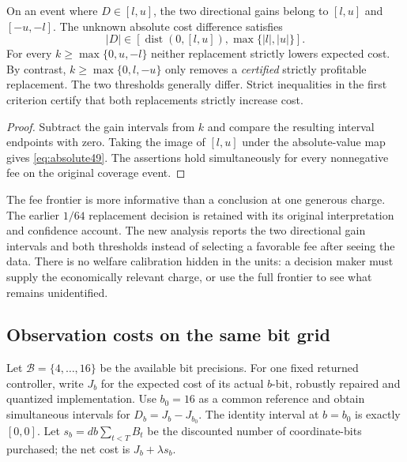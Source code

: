 \begin{corollary}\label{cor:fee49}
On an event where $D\in[l,u]$, the two directional gains belong to $[l,u]$ and $[-u,-l]$. The unknown absolute cost difference satisfies
\begin{equation}\label{eq:absolute49}
 |D|\in[\operatorname{dist}(0,[l,u]),\max\{|l|,|u|\}].
\end{equation}
For every $k\ge\max\{0,u,-l\}$ neither replacement strictly lowers expected cost. By contrast, $k\ge\max\{0,l,-u\}$ only removes a \emph{certified} strictly profitable replacement. The two thresholds generally differ. Strict inequalities in the first criterion certify that both replacements strictly increase cost.
\end{corollary}
\begin{proof}
Subtract the gain intervals from $k$ and compare the resulting interval endpoints with zero. Taking the image of $[l,u]$ under the absolute-value map gives \eqref{eq:absolute49}. The assertions hold simultaneously for every nonnegative fee on the original coverage event.
\end{proof}

The fee frontier is more informative than a conclusion at one generous charge. The earlier $1/64$ replacement decision is retained with its original interpretation and confidence account. The new analysis reports the two directional gain intervals and both thresholds instead of selecting a favorable fee after seeing the data. There is no welfare calibration hidden in the units: a decision maker must supply the economically relevant charge, or use the full frontier to see what remains unidentified.

\subsection{Observation costs on the same bit grid}
Let $\mathcal B=\{4,\ldots,16\}$ be the available bit precisions. For one fixed returned controller, write $J_b$ for the expected cost of its actual $b$-bit, robustly repaired and quantized implementation. Use $b_0=16$ as a common reference and obtain simultaneous intervals for $D_b=J_b-J_{b_0}$. The identity interval at $b=b_0$ is exactly $[0,0]$. Let $s_b=d b\sum_{t<T}B_t$ be the discounted number of coordinate-bits purchased; the net cost is $J_b+\lambda s_b$.

